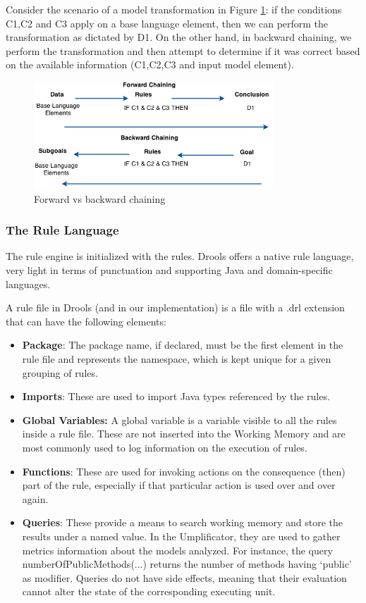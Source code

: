 Consider the scenario of a model transformation in Figure \ref{fig:backwardForward}: if the conditions C1,C2 and C3 apply on a base language element, then we can perform the transformation as dictated by D1. 
On the other hand, in backward chaining, we perform the transformation and then attempt to determine if it was correct based on the available information (C1,C2,C3 and input model element).

\begin{figure}[h]
\centering
\includegraphics[width=0.80\textwidth]{Figures/ForwardBackwardChaining.png}
\caption{Forward vs backward chaining}
\label{fig:backwardForward}
\end{figure}

\subsubsection{The Rule Language}
The rule engine is initialized with the rules. Drools offers a native rule language, very light in terms of punctuation and supporting Java and domain-specific languages. 

A rule file in Drools (and in our implementation) is a file with a .drl extension that can have the following elements:

\begin{itemize}
\item \textbf{Package}: The package name, if declared, must be the first element in the rule file and represents the namespace, which is kept unique for a given grouping of rules.
\item \textbf{Imports}: These are used to import Java types referenced by the rules.
\item \textbf{Global Variables:} A global variable is a variable visible to all the rules inside a rule file. These are not inserted into the Working Memory and are most commonly used to log information on the execution of rules.
\item \textbf{Functions}: These are used for invoking actions on the consequence (then) part of the rule, especially if that particular action is used over and over again. 
\item \textbf{Queries}: These provide a means to search working memory and store the results under a named value. In the Umplificator, they are used to gather metrics information about the models analyzed. For instance, the query  numberOfPublicMethods(...) returns the number of methods having `public' as modifier. Queries do not have side effects, meaning that their evaluation cannot alter the state of the corresponding executing unit. 
\end{itemize}

